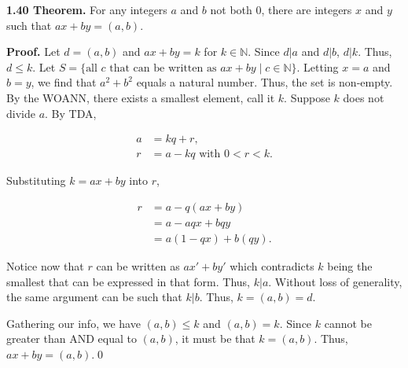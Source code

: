 \documentclass[12pt]{article}
\begin{document}
\noindent\textbf{1.40 Theorem.} For any integers $a$ and $b$ not both 0, there are integers $x$ and $y$ such that $ax+by=(a,b)$.

\bigskip

\noindent\textbf{Proof.} Let $d=(a,b)$ and $ax+by=k$ for $k\in\mathbb{N}$. Since $d|a$ and $d|b$, $d|k$. Thus, $d\leq k$. Let $S= \{\text{all }c \text{ that can be written as }ax+by \mid c\in\mathbb{N}\}$. Letting $x=a$ and $b=y$, we find that $a^2+b^2$ equals a natural number. Thus, the set is non-empty. By the WOANN, there exists a smallest element, call it $k$. Suppose $k$ does not divide $a$. By TDA,

\begin{align*}
a &= kq + r,\\
r &= a - kq  \text{ with } 0< r < k.
\end{align*}

\noindent Substituting $k=ax+by$ into $r$, 

\begin{align*}
r &= a - q(ax+by) \\
&= a - aqx + bqy\\
&= a(1-qx) + b(qy).
\end{align*}

\noindent Notice now that $r$ can be written as $ax'+by'$ which contradicts $k$ being the smallest that can be expressed in that form. Thus, $k|a$. Without loss of generality, the same argument can be such that $k|b$. Thus, $k=(a,b)=d$.

\bigskip

\noindent Gathering our info, we have $(a,b)\leq k$ and $(a,b)=k$. Since $k$ cannot be greater than AND equal to $(a,b)$, it must be that $k=(a,b)$. Thus, $ax+by=(a,b)$.\qed
\end{document}

